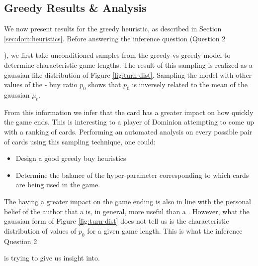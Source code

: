 \subsection{Greedy Results \& Analysis} \label{sec:dom:greedy-results}
We now present results for the greedy heuristic, as described in
Section \ref{sec:dom:heuristics}. Before answering the inference
question (Question 2\ignore{\ref{q:inference}}), we first take unconditioned
samples from the greedy-vs-greedy model to determine characteristic
game lengths. The result of this sampling is realized as a
gaussian-like distribution of Figure \ref{fig:turn-dist}. Sampling
the model with other values of the  - 
buy ratio $p_0$ shows that $p_0$ is inversely related to the mean
of the gaussian $\mu_{t}$.

From this information we infer that the  card has
a greater impact on how quickly the game ends. This is interesting
to a player of Dominion attempting to come up with a ranking of
cards. Performing an automated analysis on every possible pair
of cards using this sampling technique, one could:

\begin{itemize}
\item Design a good greedy buy heuristics
\item Determine the balance of the hyper-parameter corresponding
      to which cards are being used in the game.
\end{itemize}

The  having a greater impact on the game ending is
also in line with the personal belief of the author that a
 is, in general, more useful than a .
However, what the gaussian form of Figure \ref{fig:turn-dist}
does not tell us is the characteristic distribution of values of
$p_0$ for a given game length. This is what the inference Question
2 \ignore{\ref{q:inference}} is trying to give us insight into.




